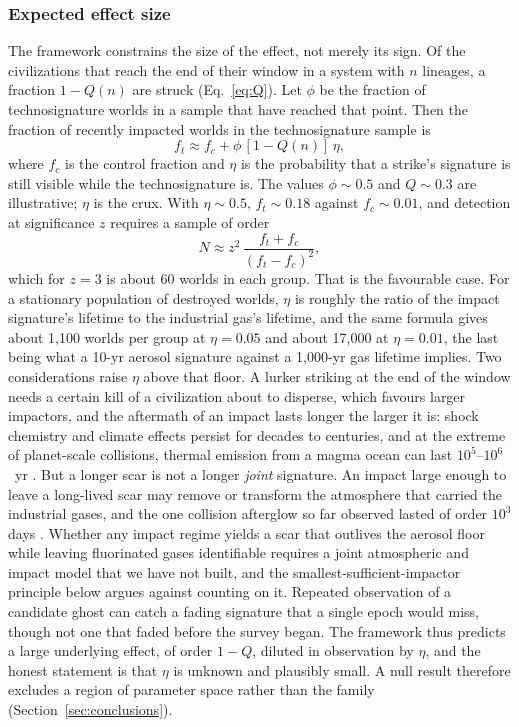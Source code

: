 \documentclass[preprint,12pt]{elsarticle}
\theoremstyle{definition}
\begin{document}
\subsubsection{Expected effect size}

The framework constrains the size of the effect, not merely its sign. Of the civilizations that reach the end of their window in a system with $n$ lineages, a fraction $1 - Q(n)$ are struck (Eq.~\ref{eq:Q}). Let $\phi$ be the fraction of technosignature worlds in a sample that have reached that point. Then the fraction of recently impacted worlds in the technosignature sample is
\begin{equation}
f_{t} \approx f_{c} + \phi\,[1 - Q(n)]\,\eta ,
\end{equation}
where $f_{c}$ is the control fraction and $\eta$ is the probability that a strike's signature is still visible while the technosignature is. The values $\phi \sim 0.5$ and $Q \sim 0.3$ are illustrative; $\eta$ is the crux. With $\eta \sim 0.5$, $f_{t} \sim 0.18$ against $f_{c} \sim 0.01$, and detection at significance $z$ requires a sample of order
\begin{equation}
N \approx z^{2}\,\frac{f_{t} + f_{c}}{(f_{t} - f_{c})^{2}} ,
\end{equation}
which for $z = 3$ is about 60 worlds in each group. That is the favourable case. For a stationary population of destroyed worlds, $\eta$ is roughly the ratio of the impact signature's lifetime to the industrial gas's lifetime, and the same formula gives about 1,100 worlds per group at $\eta = 0.05$ and about 17,000 at $\eta = 0.01$, the last being what a 10-yr aerosol signature against a 1,000-yr gas lifetime implies. Two considerations raise $\eta$ above that floor. A lurker striking at the end of the window needs a certain kill of a civilization about to disperse, which favours larger impactors, and the aftermath of an impact lasts longer the larger it is: shock chemistry and climate effects persist for decades to centuries, and at the extreme of planet-scale collisions, thermal emission from a magma ocean can last $10^{5}$--$10^{6}$~yr \citep{Lupu2014}. But a longer scar is not a longer \emph{joint} signature. An impact large enough to leave a long-lived scar may remove or transform the atmosphere that carried the industrial gases, and the one collision afterglow so far observed lasted of order $10^{3}$ days \citep{Kenworthy2023}. Whether any impact regime yields a scar that outlives the aerosol floor while leaving fluorinated gases identifiable requires a joint atmospheric and impact model that we have not built, and the smallest-sufficient-impactor principle below argues against counting on it. Repeated observation of a candidate ghost can catch a fading signature that a single epoch would miss, though not one that faded before the survey began. The framework thus predicts a large underlying effect, of order $1 - Q$, diluted in observation by $\eta$, and the honest statement is that $\eta$ is unknown and plausibly small. A null result therefore excludes a region of parameter space rather than the family (Section~\ref{sec:conclusions}).
\end{document}
